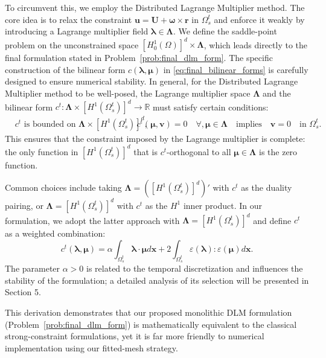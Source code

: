 \documentclass{article}
\newcommand{\bU}{{\mathbf{U}}}
\newcommand{\bx}{{\mathbf{x}}}
\newcommand{\bu}{{\mathbf{u}}}
\newcommand{\bv}{{\mathbf{v}}}
\newcommand{\br}{{\mathbf{r}}}
\begin{document}
To circumvent this, we employ the Distributed Lagrange Multiplier method. The core idea is to relax the constraint $\bu = \bU + \boldsymbol{\omega} \times \br$ in $\Omega_s^t$ and enforce it weakly by introducing a Lagrange multiplier field $\boldsymbol{\lambda} \in \boldsymbol{\Lambda}$.
We define the saddle-point problem on the unconstrained space $[H^1_0(\Omega)]^d \times \boldsymbol{\Lambda}$, which leads directly to the final formulation stated in Problem~\ref{prob:final_dlm_form}. 
The specific construction of the bilinear form $c(\boldsymbol{\lambda}, \boldsymbol{\mu})$ in \eqref{eq:final_bilinear_forms} is carefully designed to ensure numerical stability. In general, for the Distributed Lagrange Multiplier method to be well-posed, the Lagrange multiplier space $\boldsymbol{\Lambda}$ and the bilinear form $c^t : \boldsymbol{\Lambda} \times [H^1(\Omega_s^t)]^d \to \mathbb{R}$ must satisfy certain conditions:
\begin{equation*}
\begin{aligned}
&c^t \text{ is bounded on } \boldsymbol{\Lambda} \times [H^1(\Omega_s^t)]^d, \
&c^t(\boldsymbol{\mu}, \bv) = 0 \quad \forall, \boldsymbol{\mu} \in \boldsymbol{\Lambda} \quad \text{implies} \quad \bv = 0 \quad \text{in } \Omega_s^t.
\end{aligned}
\end{equation*}
This ensures that the constraint imposed by the Lagrange multiplier is complete: the only function in $[H^1(\Omega_s^t)]^d$ that is $c^t$-orthogonal to all $\boldsymbol{\mu} \in \boldsymbol{\Lambda}$ is the zero function.

Common choices include taking $\boldsymbol{\Lambda} = ([H^1(\Omega_s^t)]^d)'$ with $c^t$ as the duality pairing, or $\boldsymbol{\Lambda} = [H^1(\Omega_s^t)]^d$ with $c^t$ as the $H^1$ inner product. In our formulation, we adopt the latter approach with $\boldsymbol{\Lambda} = [H^1(\Omega_s^t)]^d$ and define $c^t$ as a weighted combination:
\begin{equation*}
c^t(\boldsymbol{\lambda}, \boldsymbol{\mu}) = \alpha \int_{\Omega_s^t} \boldsymbol{\lambda} \cdot \boldsymbol{\mu} d\bx + 2 \int_{\Omega_s^t} \varepsilon(\boldsymbol{\lambda}) : \varepsilon(\boldsymbol{\mu}) d\bx.
\end{equation*}
The parameter $\alpha > 0$ is related to the temporal discretization and influences the stability of the formulation; a detailed analysis of its selection will be presented in Section 5. 

This derivation demonstrates that our proposed monolithic DLM formulation (Problem~\ref{prob:final_dlm_form}) is mathematically equivalent to the classical strong-constraint formulations, yet it is far more friendly to numerical implementation using our fitted-mesh strategy.
\end{document}
